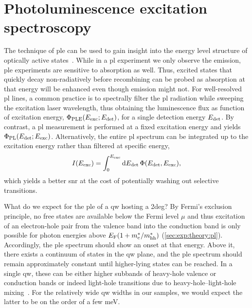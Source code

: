 \section{Photoluminescence excitation spectroscopy}\label{sec:exp:observations:ple}
The technique of \acrfull{ple} can be used to gain insight into the energy level structure of optically active states~\cite{Gilliland1997}.
While in a \gls{pl} experiment we only observe the emission, \gls{ple} experiments are sensitive to absorption as well.
Thus, excited states that quickly decay non-radiatively before recombining can be probed as absorption at that energy will be enhanced even though emission might not.
For well-resolved \gls{pl} lines, a common practice is to spectrally filter the \gls{pl} radiation while sweeping the excitation laser wavelength, thus obtaining the luminescence flux as function of excitation energy, $\Phi_{\mathrm{PLE}}(E_{\mathrm{exc}}; E_{\mathrm{det}})$, for a single detection energy $E_{\mathrm{det}}$.
By contrast, a \gls{pl} measurement is performed at a fixed excitation energy and yields $\Phi_{\mathrm{PL}}(E_{\mathrm{det}}; E_{\mathrm{exc}})$.
Alternatively, the entire \gls{pl} spectrum can be integrated up to the excitation energy rather than filtered at specific energy,
\begin{equation}\label{eq:exp:ple}
    I(E_{\mathrm{exc}}) = \int_{0}^{E_{\mathrm{exc}}}\dd{E_{\ensuremath{\mathrm{det}}}} \Phi(E_{\mathrm{det}}, E_{\mathrm{exc}}),
\end{equation}
which yields a better \gls{snr} at the cost of potentially washing out selective transitions.

What do we expect for the \gls{ple} of a \gls{qw} hosting a \gls{2deg}?
By Fermi's exclusion principle, no free states are available below the Fermi level $\mu$ and thus excitation of an electron-hole pair from the valence band into the conduction band is only possible for photon energies above $E_{\mathrm{F}}(1 + m_{\mathrm{c}}^\ast/m_{\mathrm{hh}}^\ast)$ (\cref{sec:exp:theory:pl}).
Accordingly, the \gls{ple} spectrum should show an onset at that energy.
Above it, there exists a continuum of states in the \gls{qw} plane, and the \gls{ple} spectrum should remain approximately constant until higher-lying states can be reached.
In a single \gls{qw}, these can be either higher subbands of heavy-hole valence or conduction bands or indeed light-hole transitions due to heavy-hole--light-hole mixing~\cite{Bastard1984,Miller1985b,Laruelle1988,Reynolds1988,ElKhalifi1989}.
For the relatively wide \gls{qw} widths in our samples, we would expect the latter to be on the order of a few \unit{\milli\electronvolt}.

